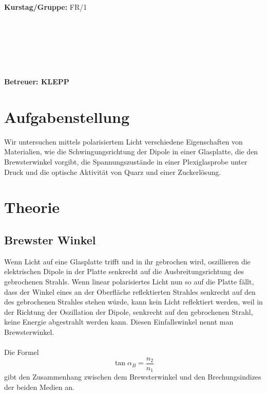 \documentclass[twoside]{article}
\begin{document}
\begin{verbatim}


\end{verbatim}
			\begin{flushleft}
			\textbf{\Large{Kurstag/Gruppe:}} \Large{FR/1}
			\end{flushleft}

\begin{verbatim}






\end{verbatim}
			\begin{flushleft}
			\LARGE{\textbf{Betreuer:\Large{ KLEPP }}}		
			\end{flushleft}

\newpage
\section{Aufgabenstellung}
Wir untersuchen mittels polarisiertem Licht verschiedene Eigenschaften von Materialien, wie die Schwingungsrichtung der Dipole in einer Glasplatte, die den Brewsterwinkel vorgibt, die Spannungszustände in einer Plexiglasprobe unter Druck und die optische Aktivität von Quarz und einer Zuckerlösung.

\section{Theorie}
\subsection{Brewster Winkel}
Wenn Licht auf eine Glasplatte trifft und in ihr gebrochen wird, oszillieren die elektrischen Dipole in der Platte senkrecht auf die Ausbreitungsrichtung des gebrochenen Strahls. Wenn linear polarisiertes Licht nun so auf die Platte fällt, dass der Winkel eines an der Oberfläche reflektierten Strahles senkrecht auf den des gebrochenen Strahles stehen würde, kann kein Licht reflektiert werden, weil in der Richtung der Oszillation der Dipole, senkrecht auf den gebrochenen Strahl, keine Energie abgestrahlt werden kann. Diesen Einfallswinkel nennt man Brewsterwinkel.\\
\\
Die Formel 
$$\tan \alpha_B=\frac{n_2}{n_1}$$
gibt den Zusammenhang zwischen dem Brewsterwinkel und den Brechungsindizes der beiden Medien an.
\end{document}
